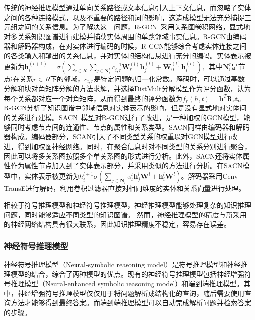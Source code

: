 \documentclass[algorithmlist, AutoFakeBold, AutoFakeSlant, figurelist, tablelist, nomlist, engineering, openany]{seuthesix} %
\begin{document}
传统的神经推理模型通过单向关系路径或文本信息引入上下文信息，而忽略了实体之间的各种连接模式，以及不重要的路径和词的影响，这造成模型无法充分捕捉三元组之间的关系信息。为了解决这一问题，R-GCN~\cite{schlichtkrull2018modeling}采用关系图卷积网络，显式地对多关系知识图谱进行建模并捕获实体周围的单跳邻域事实信息。R-GCN由编码器和解码器构成，在对实体进行编码的时候，R-GCN能够综合考虑实体连接之间的各类输入和输出的关系信息，并对实体的结构信息进行充分的编码。实体表示被更新为$\bm{h}_i^{(l+1)}=\sigma\left(\sum_{r \in R} \sum_{j \in \mathbf{N}_i^r} c_{i, r}^{-1} \mathbf{W}_r^{(l)} \bm{h}_j^{(l)}+\mathbf{W}_0^{(l)} \bm{h}_i^{(l)}\right)$，其中$\mathbf{N}_i^r$是节点i在关系$r \in R$下的邻域，$c_{i,r}$是特定问题的归一化常数。解码时，可以通过基数分解和块对角矩阵分解的方法求解，并选择DistMult分解模型作为评分函数，认为每个关系都对应一个对角矩阵，从而得到最终的评分函数为$f_r(h, t)=\bm{h}^T \mathbf{R}_r \bm{t}$。R-GCN分析了知识图谱中邻域信息对实体表示的影响，但是没有显式地对实体间的关系进行建模。SACN~\cite{shang2019end}模型对R-GCN进行了改进，是一种加权的GCN模型，能够同时考虑节点间的连通性、节点的属性和关系类型。SACN同样由编码器和解码器构成。编码器部分，SCAN引入了不同类型关系的权重以对GCN模型进行改进，得到加权图神经网络。同时，在聚合信息时对不同类型的关系分别进行聚合，因此可以将多关系图按照多个单关系图的形式进行分析。此外，SACN还将实体属性作为属性节点加入到了实体表示部分，并采用类似的方法进行分析。在SACN模型中，实体表示被更新为$h_i^{l+1}\sigma\left(\sum_{j \in \mathbf{N}_i} \alpha_t^l \bm{h}_j^l \mathbf{W}^l+\bm{h}_i^l \mathbf{W}^l\right)$。解码器采用Conv-TransE进行解码，利用卷积过滤器直接对相同维度的实体和关系向量进行处理。

相较于符号推理模型和神经符号推理模型，神经推理模型能够处理复杂的知识推理问题，同时能够适应不同类型的知识图谱。
然而，神经推理模型的精度与所采用的神经网络结构具有很大联系，因此知识推理精度不稳定，容易存在误差。

\subsubsection{神经符号推理模型}
神经符号推理模型（Neural-symbolic reasoning model）是符号推理模型和神经推理模型的结合，综合了两种模型的优点。现有的神经符号推理模型包括神经增强符号推理模型（Neural-enhanced symbolic reasoning model）和端到端推理模型。其中，神经增强符号推理模型仅仅用于将问题解析成结构化的查询，随后需要使用查询方法才能够得到最终答案。而端到端推理模型可以自动完成解析问题并检索答案的步骤。
\end{document}
